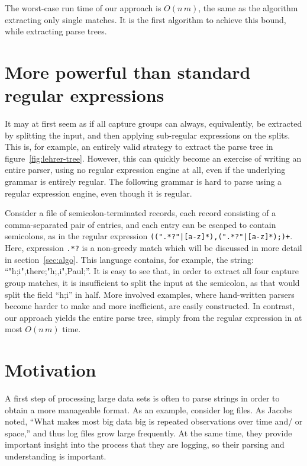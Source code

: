 \documentclass[11pt]{Thesis}
\theoremstyle{definition}
\newcommand{\Figref}[1]{figure~\ref{fig:#1}}
\newcommand{\Secref}[1]{section~\ref{sec:#1}}
\newcommand{\seclabel}[1]{\label{sec:#1}}
\begin{document}
The worst-case run time of our approach is $O(n\,m)$, the same as the 
algorithm extracting only single matches. It is the first algorithm to achieve
this bound, while extracting parse trees.

\section{More powerful than standard regular expressions}
\seclabel{power}
It may at first seem as if all capture groups can always, equivalently,
be extracted by splitting the input, and then applying sub-regular
expressions on the splits.  This is, for example, an entirely valid
strategy to extract the parse tree in \Figref{lehrer-tree}.  However,
this can quickly become an exercise of writing an entire parser,
using no regular expression engine at all, even if the underlying
grammar is entirely regular.  The following grammar is hard to parse
using a regular expression engine, even though it is regular.

Consider a file of semicolon-terminated records, each record consisting
of a comma-separated pair of entries, and each entry can be escaped
to contain semicolons, as in the regular expression
\texttt{((".*?"|[a-z]*),(".*?"|[a-z]*);)+}. Here, expression
\texttt{.*?} is a non-greedy match which will be discussed in more
detail in \Secref{algo}.  This language contains, for example, the
string: ``"h;i",there;"h;,i",Paul;''.  It is easy to see that, in
order to extract all four capture group matches, it is insufficient
to split the input at the semicolon, as that would split the field
``h;i'' in half.  More involved examples, where hand-written parsers
become harder to make and more inefficient, are easily constructed.
In contrast, our approach yields the entire parse tree, simply from
the regular expression in at most $O(n\,m)$ time.

\section{Motivation}

A first step of processing large data sets is often to parse strings in order 
to obtain a more manageable format. As an example, consider log files.  As
Jacobs\cite{Jaco09a} noted, ``What makes most big data big is repeated
observations over time and/ or space,'' and thus log files grow large
frequently. At the same time, they provide important insight into the process
that they are logging, so their parsing and understanding is important. 
\end{document}
